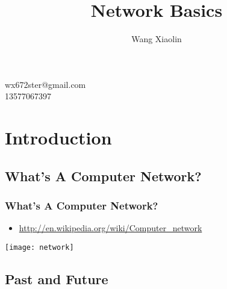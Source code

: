 \documentclass[hyperref={xetex,colorlinks,linkcolor=blue},green,compress]{beamer}
\begin{document}
\title{Network Basics}  \author{Wang Xiaolin}

\begin{frame}
  \titlepage \vfill \tiny{ wx672ster@gmail.com\\ 13577067397}
\end{frame}


\section{Introduction}
\label{sec:intro}


\subsection[Definition]{What's A Computer Network?}
\label{sec:whats}

\begin{frame}\frametitle{{What's A Computer Network?}}
  
\begin{itemize}
\item \href{http://en.wikipedia.org/wiki/Computer\_network}{http://en.wikipedia.org/wiki/Computer\_network}
\end{itemize}

\begin{center}
  \texttt{[image: network]}
\end{center}

\end{frame}

\subsection[History]{Past and Future}
\label{sec:history}
\end{document}
